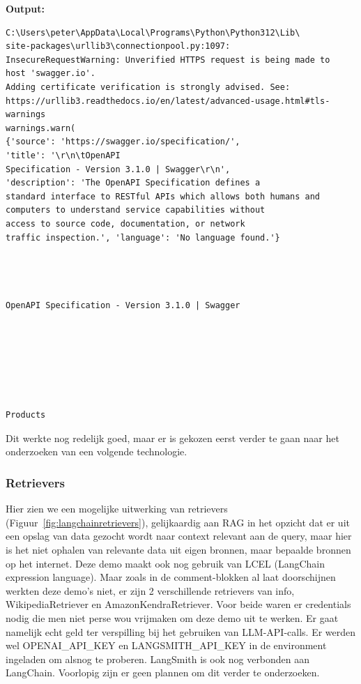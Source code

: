 \textbf{Output:}
\begin{tcolorbox}[colback=gray!20, colframe=gray!80]
    \begin{verbatim}
C:\Users\peter\AppData\Local\Programs\Python\Python312\Lib\
site-packages\urllib3\connectionpool.py:1097: 
InsecureRequestWarning: Unverified HTTPS request is being made to
host 'swagger.io'. 
Adding certificate verification is strongly advised. See:
https://urllib3.readthedocs.io/en/latest/advanced-usage.html#tls-
warnings
warnings.warn(
{'source': 'https://swagger.io/specification/', 
'title': '\r\n\tOpenAPI 
Specification - Version 3.1.0 | Swagger\r\n',
'description': 'The OpenAPI Specification defines a 
standard interface to RESTful APIs which allows both humans and 
computers to understand service capabilities without 
access to source code, documentation, or network 
traffic inspection.', 'language': 'No language found.'}




OpenAPI Specification - Version 3.1.0 | Swagger







Products
    \end{verbatim}
\end{tcolorbox}

Dit werkte nog redelijk goed, maar er is gekozen eerst verder te gaan naar het onderzoeken van een volgende technologie.


\subsubsection{Retrievers}
\label{sssec:retrievers}

Hier zien we een mogelijke uitwerking van retrievers (Figuur~\ref{fig:langchainretrievers}), gelijkaardig aan RAG in het opzicht dat er uit een opslag van data gezocht wordt naar context relevant aan de query, maar hier is het niet ophalen van relevante data uit eigen bronnen, maar bepaalde bronnen op het internet. Deze demo maakt ook nog gebruik van LCEL (LangChain expression language). Maar zoals in de comment-blokken al laat doorschijnen werkten deze demo's niet, er zijn 2 verschillende retrievers van info, WikipediaRetriever en AmazonKendraRetriever. Voor beide waren er credentials nodig die men niet perse wou vrijmaken om deze demo uit te werken. Er gaat namelijk echt geld ter verspilling bij het gebruiken van LLM-API-calls. Er werden wel OPENAI\_API\_KEY en LANGSMITH\_API\_KEY in de environment ingeladen om alsnog te proberen. LangSmith is ook nog verbonden aan LangChain. Voorlopig zijn er geen plannen om dit verder te onderzoeken.

